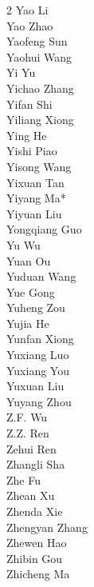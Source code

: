 \documentclass[11pt, a4paper, logo, copyright, nonumbering]{deepseek}
\begin{document}
\begin{multicols}{2}
\color{damaiblue} Yao Li \\
\color{damaiblue} Yao Zhao \\
\color{damaiblue} Yaofeng Sun \\
\color{damaiblue} Yaohui Wang \\
\color{damaiblue} Yi Yu \\
\color{damaiblue} Yichao Zhang \\
\color{damaiblue} Yifan Shi \\
\color{damaiblue} Yiliang Xiong \\
\color{damaiblue} Ying He \\
\color{damaiblue} Yishi Piao \\
\color{damaiblue} Yisong Wang \\
\color{damaiblue} Yixuan Tan \\
\color{damaiblue} Yiyang Ma* \\
\color{damaiblue} Yiyuan Liu \\
\color{damaiblue} Yongqiang Guo \\
\color{damaiblue} Yu Wu \\
\color{damaiblue} Yuan Ou \\
\color{damaiblue} Yuduan Wang \\
\color{damaiblue} Yue Gong \\
\color{damaiblue} Yuheng Zou \\
\color{damaiblue} Yujia He \\
\color{damaiblue} Yunfan Xiong \\
\color{damaiblue} Yuxiang Luo \\
\color{damaiblue} Yuxiang You \\
\color{damaiblue} Yuxuan Liu \\
\color{damaiblue} Yuyang Zhou \\
\color{damaiblue} Z.F. Wu \\
\color{damaiblue} Z.Z. Ren \\
\color{damaiblue} Zehui Ren \\
\color{damaiblue} Zhangli Sha \\
\color{damaiblue} Zhe Fu \\
\color{damaiblue} Zhean Xu \\
\color{damaiblue} Zhenda Xie \\
\color{damaiblue} Zhengyan Zhang \\
\color{damaiblue} Zhewen Hao \\
\color{damaiblue} Zhibin Gou \\
\color{damaiblue} Zhicheng Ma \\

\end{multicols}
\end{document}
